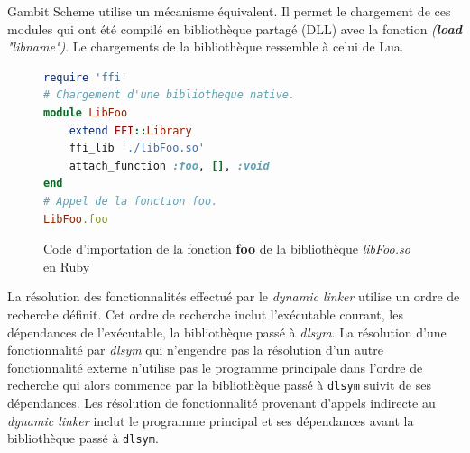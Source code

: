 \documentclass[12pt,initial,twoside,maitrise]{dms}
\numberwithin{equation}{section}
\numberwithin{table}{chapter}
\numberwithin{figure}{chapter}
\begin{document}
Gambit Scheme utilise un mécanisme équivalent. Il permet le chargement de ces modules qui ont été compilé
en bibliothèque partagé (DLL) avec la fonction \textit{(\textbf{load} "libname")}. Le chargements de la
bibliothèque ressemble à celui de Lua.


\begin{center}
\begin{figure}[ht]
\begin{lstlisting}[language=ruby,frame=single]
require 'ffi'
# Chargement d'une bibliotheque native.
module LibFoo
    extend FFI::Library
    ffi_lib './libFoo.so'
    attach_function :foo, [], :void
end
# Appel de la fonction foo.
LibFoo.foo
\end{lstlisting}
\caption{Code d'importation de la fonction \textbf{foo} de la bibliothèque \textit{libFoo.so} en Ruby}
\end{figure}
\end{center}

La résolution des fonctionnalités effectué par le \textit{dynamic linker} utilise un ordre de recherche
définit. Cet ordre de recherche inclut l'exécutable courant, les dépendances de l'exécutable, la bibliothèque
passé à \textit{dlsym}. La résolution d'une fonctionnalité par \textit{dlsym} qui n'engendre pas la résolution
d'un autre fonctionnalité externe n'utilise pas le programme principale dans l'ordre de recherche qui alors
commence par la bibliothèque passé à \verb|dlsym| suivit de ses dépendances. Les résolution de fonctionnalité
provenant d'appels indirecte au \textit{dynamic linker} inclut le programme principal et ses dépendances avant
la bibliothèque passé à \verb|dlsym|.
\end{document}
